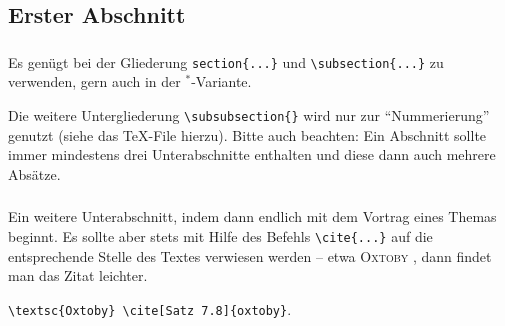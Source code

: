 \thispagestyle{empty}
\begin{abstract}
Hier steht eine kurze Zusammenfassung des Inhalts des Vortrags oder der Hausarbeit.
Dazu dieses \TeX{}-File kopieren und umbenennen.
Weitergehende Literatur ist im  Literatur\-verzeichnis aufgeführt, wobei ich das Buch von \textsc{Voss} \cite{voss-wiss} empfehlen kann.
Für einen Einstieg empfehle ich \emph{l2kurz.pdf}, das man auf 
%
\begin{center}
\texttt{http://mirror.ctan.org/info/lshort/german/} 
\end{center}
%
findet.
Dieses ist als Kurzeinführung gut geeignet, verwendet aber die üblichen Dokumentklassen von \LaTeX{} und nicht die besser geeigneten von `KOMA-Script`.
Weiteres in meinem Erläuterungen \emph{Sem-ReadMe.md}.
Ein Teil der hier angegeben Literatur und weiteres findet sich auf ILIAS \bzw in dem \og PDF.
\end{abstract}
%
\subsection{Erster Abschnitt}\label{sec:erster-abschnitt}
\subsubsection{}
Es genügt bei der Gliederung \verb|section{...}| und \verb|\subsection{...}| zu verwenden, gern auch in der $ ^{*} $-Variante.

Die weitere Untergliederung \verb|\subsubsection{}| wird nur zur \enquote{Nummerierung} genutzt (siehe das \TeX{}-File hierzu).
Bitte auch beachten: Ein Abschnitt sollte immer mindestens drei Unterabschnitte enthalten und diese dann auch mehrere Absätze. 

%
\subsubsection{} 
Ein weitere Unterabschnitt, indem dann endlich mit dem Vortrag eines Themas beginnt. 
Es sollte aber stets mit Hilfe des Befehls \verb|\cite{...}| auf die entsprechende Stelle des Textes verwiesen werden -- etwa \textsc{Oxtoby} \cite[Satz 7.8]{oxtoby}, dann findet man das Zitat leichter. 
%
\begin{center}
\verb|\textsc{Oxtoby} \cite[Satz 7.8]{oxtoby}|.
\end{center}
%
